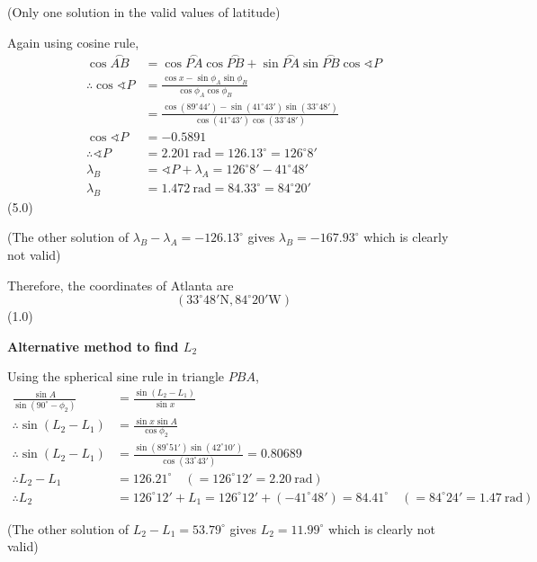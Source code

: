(Only one solution in the valid values of latitude)

Again using cosine rule,
\begin{align*}
  \cos\overset{\frown}{AB}
    &= \cos\overset{\frown}{PA}\cos\overset{\frown}{PB}
     + \sin\overset{\frown}{PA}\sin\overset{\frown}{PB}
       \cos\sphericalangle P\\
  \therefore \cos\sphericalangle P
    &= \frac{\cos x - \sin\phi_A \sin\phi_B}{\cos\phi_A \cos\phi_B}\\
    &= \frac{\cos(89^\circ 44') - \sin(41^\circ 43')\sin(33^\circ 48')}
            {\cos(41^\circ 43')\cos(33^\circ 48')}\\
  \cos\sphericalangle P &= -0.5891\\
  \therefore \sphericalangle P
    &= 2.201\ \mathrm{rad} = 126.13^\circ = 126^\circ 8'\\
  \lambda_B &= \sphericalangle P + \lambda_A = 126^\circ 8' - 41^\circ 48'\\
  \lambda_B &= 1.472\ \mathrm{rad} = 84.33^\circ = 84^\circ 20'
\end{align*}
\hfill(5.0)

(The other solution of $\lambda_B - \lambda_A = -126.13^\circ$ gives
$\lambda_B = -167.93^\circ$ which is clearly not valid)

Therefore, the coordinates of Atlanta are
\[
  (33^\circ 48'\mathrm{N}, 84^\circ 20'\mathrm{W})
\]
\hfill(1.0)

\medskip
\noindent\textbf{Alternative method to find $L_2$}

Using the spherical sine rule in triangle $PBA$,
\begin{align*}
  \frac{\sin A}{\sin(90^\circ - \phi_2)}
    &= \frac{\sin(L_2 - L_1)}{\sin x}\\
  \therefore \sin(L_2 - L_1) &= \frac{\sin x \sin A}{\cos\phi_2}\\
  \therefore \sin(L_2 - L_1)
    &= \frac{\sin(89^\circ 51')\sin(42^\circ 10')}{\cos(33^\circ 43')}
     = 0.80689\\
  \therefore L_2 - L_1
    &= 126.21^\circ \quad (= 126^\circ 12' = 2.20\ \mathrm{rad})\\
  \therefore L_2 &= 126^\circ 12' + L_1
    = 126^\circ 12' + (-41^\circ 48') = 84.41^\circ
    \quad (= 84^\circ 24' = 1.47\ \mathrm{rad})
\end{align*}

(The other solution of $L_2 - L_1 = 53.79^\circ$ gives $L_2 = 11.99^\circ$
which is clearly not valid)

